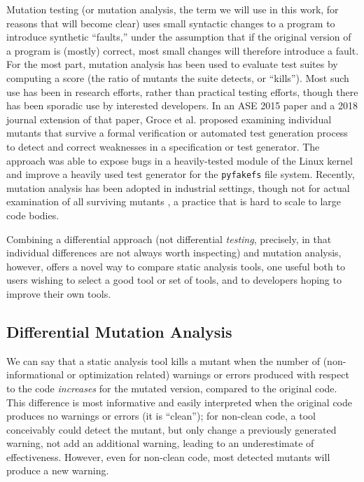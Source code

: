 Mutation testing \cite{demillo1978hints,budd1980theoretical} (or mutation analysis, the term we will use in this work, for reasons that will become clear) uses small syntactic changes to a program to introduce synthetic ``faults,'' under the assumption that if the original version of a program is (mostly) correct, most small changes will therefore introduce a fault.  For the most part, mutation analysis has been used to evaluate test suites by computing a score (the ratio of mutants the suite detects, or ``kills'').  Most such use has been in research efforts, rather than practical testing efforts, though there has been sporadic use by interested developers.
In an ASE 2015 \cite{groce2015verified} paper and a 2018 journal extension \cite{groce2018verified} of that paper, Groce et al. proposed examining individual mutants that survive a formal verification or automated test generation process to detect and correct weaknesses in a specification or test generator.  The approach was able to expose bugs in a heavily-tested module of the Linux kernel \cite{mutKernel} and improve a heavily used test generator for the {\tt pyfakefs} file system.  Recently, mutation analysis has been adopted in industrial settings, though not for actual examination of all surviving mutants \cite{MutGoogle,ivankovic2018industrial}, a practice that is hard to scale to large code bodies.

Combining a differential approach (not differential \emph{testing}, precisely, in that individual differences are not always worth inspecting) and mutation analysis, however, offers a novel way to compare static analysis tools, one useful both to users wishing to select a good tool or set of tools, and to developers hoping to improve their own tools.

\subsection{Differential Mutation Analysis}

We can say that a static analysis tool kills a mutant when the number of (non-informational or optimization related) warnings or errors produced with respect to the code \emph{increases} for the mutated version, compared to the original code.  This difference is most informative and easily interpreted when the original code produces no warnings or errors (it is ``clean''); for non-clean code, a tool conceivably could detect the mutant, but only change a previously generated warning, not add an additional warning, leading to an underestimate of effectiveness.  However, even for non-clean code, most detected mutants will produce a new warning.


